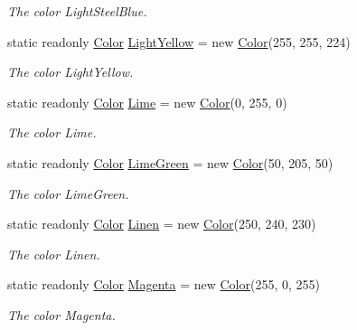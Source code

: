 \begin{DoxyCompactItemize}
\begin{DoxyCompactList}\small\item\em The color Light\-Steel\-Blue. \end{DoxyCompactList}\item 
static readonly \hyperlink{struct_tri_devs_1_1_tri_engine2_d_1_1_color}{Color} \hyperlink{struct_tri_devs_1_1_tri_engine2_d_1_1_color_a5a25f591f013f71e14287213c17034d6}{Light\-Yellow} = new \hyperlink{struct_tri_devs_1_1_tri_engine2_d_1_1_color}{Color}(255, 255, 224)
\begin{DoxyCompactList}\small\item\em The color Light\-Yellow. \end{DoxyCompactList}\item 
static readonly \hyperlink{struct_tri_devs_1_1_tri_engine2_d_1_1_color}{Color} \hyperlink{struct_tri_devs_1_1_tri_engine2_d_1_1_color_ae5a9929e09ff5744c2e89ac254267338}{Lime} = new \hyperlink{struct_tri_devs_1_1_tri_engine2_d_1_1_color}{Color}(0, 255, 0)
\begin{DoxyCompactList}\small\item\em The color Lime. \end{DoxyCompactList}\item 
static readonly \hyperlink{struct_tri_devs_1_1_tri_engine2_d_1_1_color}{Color} \hyperlink{struct_tri_devs_1_1_tri_engine2_d_1_1_color_a0fa79e4d81a23ea27516d615d7268cd5}{Lime\-Green} = new \hyperlink{struct_tri_devs_1_1_tri_engine2_d_1_1_color}{Color}(50, 205, 50)
\begin{DoxyCompactList}\small\item\em The color Lime\-Green. \end{DoxyCompactList}\item 
static readonly \hyperlink{struct_tri_devs_1_1_tri_engine2_d_1_1_color}{Color} \hyperlink{struct_tri_devs_1_1_tri_engine2_d_1_1_color_a9a2cf760c37d3b94ff85d6536878e5f2}{Linen} = new \hyperlink{struct_tri_devs_1_1_tri_engine2_d_1_1_color}{Color}(250, 240, 230)
\begin{DoxyCompactList}\small\item\em The color Linen. \end{DoxyCompactList}\item 
static readonly \hyperlink{struct_tri_devs_1_1_tri_engine2_d_1_1_color}{Color} \hyperlink{struct_tri_devs_1_1_tri_engine2_d_1_1_color_a4c07f2d9ba23b380d14332ddfa5eb519}{Magenta} = new \hyperlink{struct_tri_devs_1_1_tri_engine2_d_1_1_color}{Color}(255, 0, 255)
\begin{DoxyCompactList}\small\item\em The color Magenta. \end{DoxyCompactList}\item 

\end{DoxyCompactItemize}
